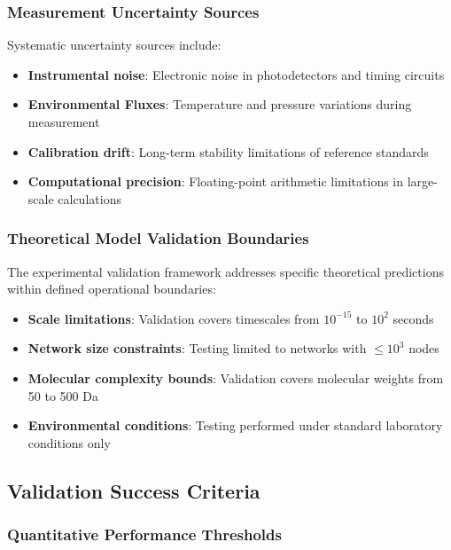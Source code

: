 \documentclass[12pt,a4paper]{article}
\begin{document}
\subsubsection{Measurement Uncertainty Sources}

Systematic uncertainty sources include:

\begin{itemize}
\item \textbf{Instrumental noise}: Electronic noise in photodetectors and timing circuits
\item \textbf{Environmental Fluxes}: Temperature and pressure variations during measurement
\item \textbf{Calibration drift}: Long-term stability limitations of reference standards
\item \textbf{Computational precision}: Floating-point arithmetic limitations in large-scale calculations
\end{itemize}

\subsubsection{Theoretical Model Validation Boundaries}

The experimental validation framework addresses specific theoretical predictions within defined operational boundaries:

\begin{itemize}
\item \textbf{Scale limitations}: Validation covers timescales from $10^{-15}$ to $10^{2}$ seconds
\item \textbf{Network size constraints}: Testing limited to networks with $\leq 10^3$ nodes
\item \textbf{Molecular complexity bounds}: Validation covers molecular weights from 50 to 500 Da  
\item \textbf{Environmental conditions}: Testing performed under standard laboratory conditions only
\end{itemize}

\subsection{Validation Success Criteria}

\subsubsection{Quantitative Performance Thresholds}
\end{document}
